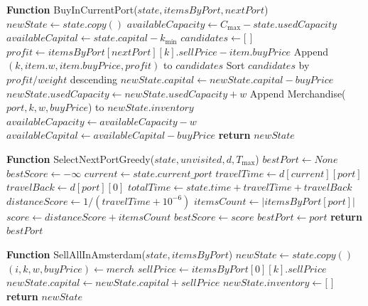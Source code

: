 \documentclass[12pt, a4paper]{article}
\begin{document}
\begin{algorithmic}[1]
\STATE

\STATE \textbf{Function} BuyInCurrentPort($state, itemsByPort, nextPort$)
\STATE $newState \gets state.copy()$
\STATE $availableCapacity \gets C_{\max} - state.usedCapacity$
\STATE $availableCapital \gets state.capital - k_{\min}$
\STATE $candidates \gets \text{[ ]}$
        \STATE $profit \gets itemsByPort[nextPort][k].sellPrice - item.buyPrice$
            \STATE Append $(k, item.w, item.buyPrice, profit)$ to $candidates$
        \ENDIF
    \ENDIF
\ENDFOR
\STATE Sort $candidates$ by $profit/weight$ descending
        \STATE $newState.capital \gets newState.capital - buyPrice$
        \STATE $newState.usedCapacity \gets newState.usedCapacity + w$
        \STATE Append Merchandise($port,k,w,buyPrice$) to $newState.inventory$
        \STATE $availableCapacity \gets availableCapacity - w$
        \STATE $availableCapital \gets availableCapital - buyPrice$
    \ENDIF
\ENDFOR
\STATE \textbf{return} $newState$

\STATE

\STATE \textbf{Function} SelectNextPortGreedy($state, unvisited, d, T_{\max}$)
\STATE $bestPort \gets None$
\STATE $bestScore \gets -\infty$
\STATE $current \gets state.current\_port$
    \STATE $travelTime \gets d[current][port]$
    \STATE $travelBack \gets d[port][0]$
    \STATE $totalTime \gets state.time + travelTime + travelBack$
        \STATE $distanceScore \gets 1 / (travelTime + 10^{-6})$
        \STATE $itemsCount \gets |itemsByPort[port]|$
        \STATE $score \gets distanceScore + itemsCount$
            \STATE $bestScore \gets score$
            \STATE $bestPort \gets port$
        \ENDIF
    \ENDIF
\ENDFOR
\STATE \textbf{return} $bestPort$

\STATE

\STATE \textbf{Function} SellAllInAmsterdam($state, itemsByPort$)
\STATE $newState \gets state.copy()$
    \STATE $(i,k,w,buyPrice) \gets merch$
    \STATE $sellPrice \gets itemsByPort[0][k].sellPrice$
    \STATE $newState.capital \gets newState.capital + sellPrice$
\ENDFOR
\STATE $newState.inventory \gets \text{[ ]}$
\STATE \textbf{return} $newState$


\end{algorithmic}
\end{document}
